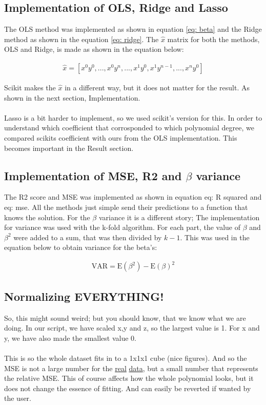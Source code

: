 \subsection{Implementation of OLS, Ridge and Lasso}

The OLS method was implemented as shown in equation \ref{eq: beta} and the Ridge
method as shown in the equation \ref{eq: ridge}. The $\hat{x}$ matrix
for both the methods, OLS and Ridge, is made as shown in the equation below:

\begin{align*}
    \hat{x} = [x^0y^0,...,x^0y^n,...,x^1y^0,x^1y^{n-1},...,x^ny^0]
\end{align*}

Scikit makes the $\hat{x}$ in a different way, but it does not matter for the result.
As shown in the next section, Implementation.
\\
\\
Lasso is a bit harder to implement, so we used scikit's version for this.\cite{scikit}
In order to understand which coefficient that corrosponded to which polynomial degree,
we compared scikits coefficient with ours from the OLS implementation. This becomes important in
the Result section.

\subsection{Implementation of MSE, R2 and $\beta$ variance}

The R2 score and MSE was implemented as shown in equation {eq: R squared} and {eq: mse}.
All the methods just simple send their predictions to a function that knows the solution.
For the $\beta$ variance it is a different story; The implementation for variance was used with the k-fold algorithm.
For each part, the value of $\beta$ and $\beta^2$ were added to a sum, that was then divided by
$k-1$. This was used in the equation below to obtain variance for the beta's:

\begin{align*}
    \text{VAR} = \text{E}(\beta^2) - \text{E}(\beta)^2
\end{align*}

\subsection{Normalizing EVERYTHING!}\label{sec:normal}
So, this might sound weird; but you should know, that we know what we are doing.
In our script, we have scaled x,y and z, so the largest value is 1. For x and y, we have
also made the smallest value 0.
\\
\\
This is so the whole dataset fits in to a 1x1x1 cube (nice figures). And so the MSE is not a large
number for the \href{https://github.com/erikfsk/fysstk4155-project-1/blob/master/project/SRTM_data_Norway_1.tif}{\color{blue}real} 
\href{https://github.com/erikfsk/fysstk4155-project-1/blob/master/project/SRTM_data_Norway_2.tif}{\color{blue}data}, but a small number that represents the relative MSE. This of course affects
how the whole polynomial looks, but it does not change the essence of fitting. And can easily be reverted
if wanted by the user.
